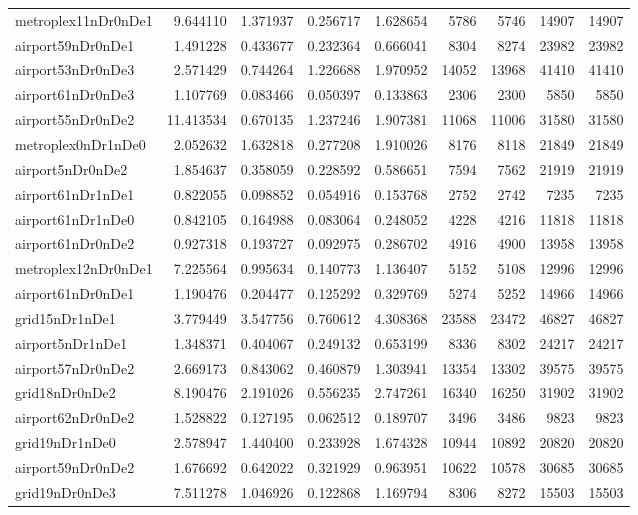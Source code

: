 \begin{longtable}{|l|r|r|r|r|r|r|r|r|}
metroplex11nDr0nDe1 & 9.644110 & 1.371937 & 0.256717 & 1.628654 & 5786 & 5746 & 14907 & 14907 \\
airport59nDr0nDe1 & 1.491228 & 0.433677 & 0.232364 & 0.666041 & 8304 & 8274 & 23982 & 23982 \\
airport53nDr0nDe3 & 2.571429 & 0.744264 & 1.226688 & 1.970952 & 14052 & 13968 & 41410 & 41410 \\
airport61nDr0nDe3 & 1.107769 & 0.083466 & 0.050397 & 0.133863 & 2306 & 2300 & 5850 & 5850 \\
airport55nDr0nDe2 & 11.413534 & 0.670135 & 1.237246 & 1.907381 & 11068 & 11006 & 31580 & 31580 \\
metroplex0nDr1nDe0 & 2.052632 & 1.632818 & 0.277208 & 1.910026 & 8176 & 8118 & 21849 & 21849 \\
airport5nDr0nDe2 & 1.854637 & 0.358059 & 0.228592 & 0.586651 & 7594 & 7562 & 21919 & 21919 \\
airport61nDr1nDe1 & 0.822055 & 0.098852 & 0.054916 & 0.153768 & 2752 & 2742 & 7235 & 7235 \\
airport61nDr1nDe0 & 0.842105 & 0.164988 & 0.083064 & 0.248052 & 4228 & 4216 & 11818 & 11818 \\
airport61nDr0nDe2 & 0.927318 & 0.193727 & 0.092975 & 0.286702 & 4916 & 4900 & 13958 & 13958 \\
metroplex12nDr0nDe1 & 7.225564 & 0.995634 & 0.140773 & 1.136407 & 5152 & 5108 & 12996 & 12996 \\
airport61nDr0nDe1 & 1.190476 & 0.204477 & 0.125292 & 0.329769 & 5274 & 5252 & 14966 & 14966 \\
grid15nDr1nDe1 & 3.779449 & 3.547756 & 0.760612 & 4.308368 & 23588 & 23472 & 46827 & 46827 \\
airport5nDr1nDe1 & 1.348371 & 0.404067 & 0.249132 & 0.653199 & 8336 & 8302 & 24217 & 24217 \\
airport57nDr0nDe2 & 2.669173 & 0.843062 & 0.460879 & 1.303941 & 13354 & 13302 & 39575 & 39575 \\
grid18nDr0nDe2 & 8.190476 & 2.191026 & 0.556235 & 2.747261 & 16340 & 16250 & 31902 & 31902 \\
airport62nDr0nDe2 & 1.528822 & 0.127195 & 0.062512 & 0.189707 & 3496 & 3486 & 9823 & 9823 \\
grid19nDr1nDe0 & 2.578947 & 1.440400 & 0.233928 & 1.674328 & 10944 & 10892 & 20820 & 20820 \\
airport59nDr0nDe2 & 1.676692 & 0.642022 & 0.321929 & 0.963951 & 10622 & 10578 & 30685 & 30685 \\
grid19nDr0nDe3 & 7.511278 & 1.046926 & 0.122868 & 1.169794 & 8306 & 8272 & 15503 & 15503 \\

\end{longtable}
